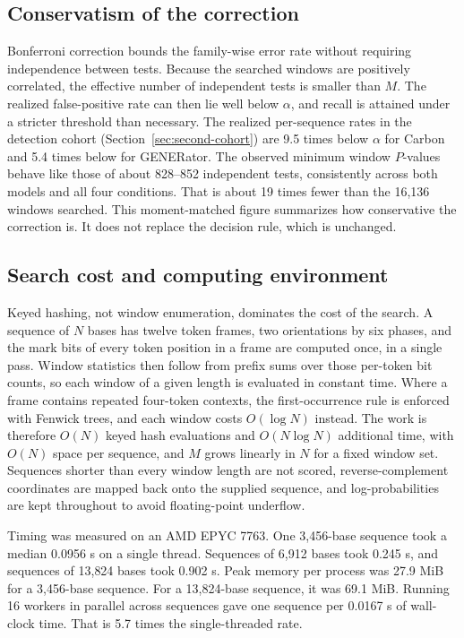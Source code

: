 \documentclass[10pt,twocolumn]{article}
\begin{document}
\subsection{Conservatism of the correction}
\label{supp:bonferroni}

Bonferroni correction bounds the family-wise error rate without requiring independence between
tests. Because the searched windows are positively correlated, the effective number of independent
tests is smaller than $M$. The realized false-positive rate can then lie well below $\alpha$, and
recall is attained under a stricter threshold than necessary. The realized per-sequence rates in the
detection cohort (Section~\ref{sec:second-cohort}) are 9.5 times below $\alpha$ for Carbon and 5.4
times below for GENERator. The observed minimum window $P$-values behave like those of about
828--852 independent tests, consistently across both models and all four conditions. That is about
19 times fewer than the 16{,}136 windows searched. This moment-matched figure summarizes how
conservative the correction is. It does not replace the decision rule, which is unchanged.

\subsection{Search cost and computing environment}
\label{supp:cost}

Keyed hashing, not window enumeration, dominates the cost of the search. A sequence of $N$ bases has
twelve token frames, two orientations by six phases, and the mark bits of every token position in
a frame are computed once, in a single pass. Window statistics then follow from prefix sums over
those per-token bit counts, so each window of a given length is evaluated in constant time. Where a
frame contains repeated four-token contexts, the first-occurrence rule is enforced with Fenwick
trees, and each window costs $O(\log N)$ instead. The work is therefore $O(N)$ keyed hash
evaluations and $O(N \log N)$ additional time, with $O(N)$ space per sequence, and $M$ grows linearly in
$N$ for a fixed window set. Sequences shorter than every window length are not scored,
reverse-complement coordinates are mapped back onto the supplied sequence, and log-probabilities are
kept throughout to avoid floating-point underflow.

Timing was measured on an AMD EPYC 7763. One 3{,}456-base sequence took a median 0.0956 s on a single
thread. Sequences of 6{,}912 bases took 0.245 s, and sequences of 13{,}824 bases took 0.902 s. Peak memory
per process was 27.9 MiB for a 3{,}456-base sequence. For a 13{,}824-base sequence, it was 69.1 MiB.
Running 16 workers in parallel across sequences gave one sequence per 0.0167 s of wall-clock time. That is
5.7 times the single-threaded rate.
\end{document}
